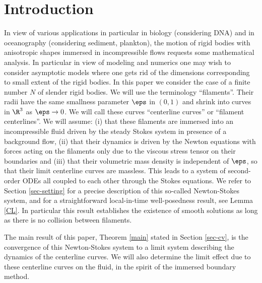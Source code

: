 \section{Introduction}
\label{sec-intro}

In view of various applications in particular in biology (considering DNA) and in oceanography (considering sediment, plankton), the motion of rigid bodies with aniso\-tropic shapes immersed in incompressible flows requests some mathematical analysis.
In particular in view of modeling and numerics one may wish to consider asymptotic models where one gets rid of the dimensions corresponding to small extent of the rigid bodies. In this paper we consider the case of a finite number $N$ of slender rigid bodies. We will use the terminology ``filaments''. Their radii have the same smallness parameter $\eps$ in $(0,1)$ and shrink into curves in $\R^3$ as $\eps \to 0$. We will call these curves ``centerline curves'' or ``filament centerlines''. We will assume: (i) that these filaments are immersed into an incompressible fluid driven by the steady Stokes system in presence of a background flow, (ii) that their dynamics is driven by the Newton equations with forces acting on the filaments only due to the viscous stress tensor on their boundaries and (iii) that their volumetric mass density is independent of $\eps$, so that their limit centerline curves are massless.
This leads to a system of second-order ODEs all coupled to each other through the Stokes equations. We refer to Section \ref{sec-setting} for a precise description of this so-called Newton-Stokes system,
and for a straightforward local-in-time well-posedness result, see Lemma \ref{CL}. In particular this result establishes the existence of smooth solutions as long as there is no collision between filaments.

The main result of this paper, Theorem \ref{main} stated in Section \ref{sec-cv}, is the convergence of this Newton-Stokes system to a limit system describing the dynamics of the centerline curves. We will also determine the limit effect due to these centerline curves on the fluid, in the spirit of the immersed boundary method.

